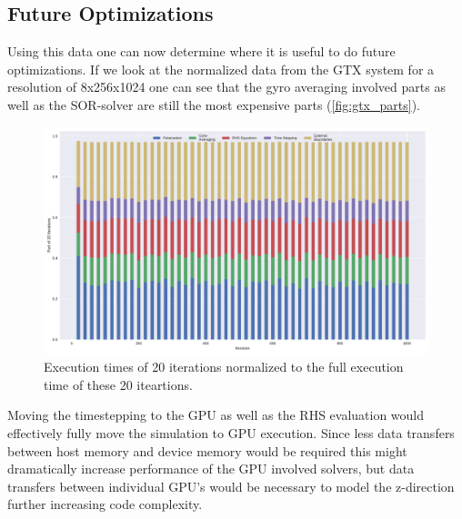 \documentclass[master.tex]{subfiles}
\begin{document}
\subsection{Future Optimizations}
Using this data one can now determine where it is useful to do future optimizations. If we look at the normalized data from the \ac{GTX} system for a resolution of 8x256x1024 one can see that the gyro averaging involved parts as well as the \ac{SOR}-solver are still the most expensive parts (\autoref{fig:gtx_parts}).
\begin{figure}[!hbtp]
    \centering
    \includegraphics[width=\linewidth]{pdfs/gtx_parts.pdf}
    \caption{\small Execution times of 20 iterations normalized to the full execution time of these 20 iteartions.}
    \label{fig:gtx_parts}
\end{figure}
Moving the timestepping to the GPU as well as the \ac{RHS} evaluation would effectively fully move the simulation to GPU execution. Since less data transfers between host memory and device memory would be required this might dramatically increase performance of the GPU involved solvers, but data transfers between individual GPU's would be necessary to model the z-direction further increasing code complexity.
\end{document}
